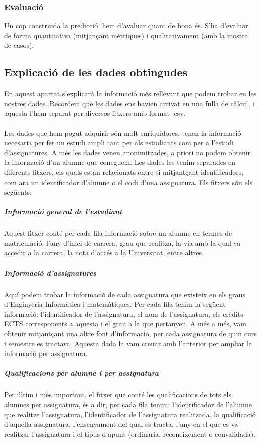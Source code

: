 \documentclass[12pt,a4paper,catalan]{article}
\begin{document}
\subsubsection{Evaluació}
Un cop construida la predicció, hem d'avaluar quant de bona és. S'ha d'evaluar de forma quantitativa (mitjançant mètriques) i qualitativament (amb la mostra de casos).

\newpage

\subsection{Explicació de les dades obtingudes} 
En aquest apartat s'explicarà la informació més rellevant que podem trobar en les nostres dades. Recordem que les dades ens havien arrivat en una fulla de càlcul, i aquesta l'hem separat per diversos fitxers amb format .csv.
\\
\\
Les dades que hem pogut adquirir són molt enriquidores, tenen la informació necesaria per fer un estudi ampli tant per als estudiants com per a l'estudi d'assignatures. A més les dades venen anonimitzades, a priori no podem obtenir la informació d'un alumne que coneguem. Les dades les tenim separades en diferents fitxers, els quals estan relacionats entre si mitjantçant identificadors, com ara un identificador d'alumne o el codi d'una assignatura. Els fitxers són els següents:

\subparagraph{Informació general de l'estudiant}
Aquest fitxer conté per cada fila informació sobre un alumne en termes de matriculació: l'any d'inici de carrera, grau que realitza, la via amb la qual va accedir a la carrera, la nota d'accés a la Universitat, entre altres.

\subparagraph{Informació d'assignatures}
Aquí podem trobar la informació de cada assignatura que existeix en els graus d'Enginyeria Informàtica i matemàtiques. Per cada fila tenim la següent informació: l'identificador de l'assignatura, el nom de l'assignatura, els crèdits ECTS corresponents a aquesta i el grau a la que pertanyen. A més a més, vam obtenir mitjantçant una altre font d'informació, per cada assignatura de quin curs i semestre es tractava. Aquesta dada la vam creuar amb l'anterior per ampliar la informació per assignatura.

\subparagraph{Qualificacions per alumne i per assignatura}
Per últim i més important, el fitxer que conté les qualificacions de tots els alumnes per assignatura, és a dir, per cada fila tenim: l'identificador de l'alumne que realitze l'assignatura, l'identificador de l'assignatura realitzada, la qualificació d'aquella assignatura, l'ensenyament del qual es tracta, l'any en el que es va realitzar l'assignatura i el tipus d'apunt (ordinaria, reconeixement o convalidada).
\end{document}
